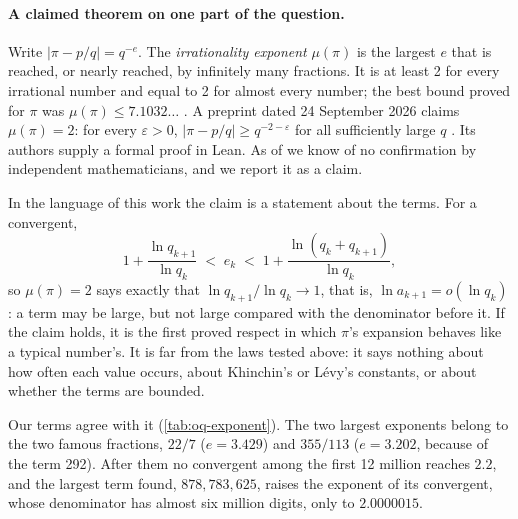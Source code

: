 \paragraph{A claimed theorem on one part of the question.} Write $|\pi - p/q| = q^{-e}$. The \emph{irrationality exponent} $\mu(\pi)$ is the largest $e$ that is reached, or nearly reached, by infinitely many fractions. It is at least 2 for every irrational number and equal to 2 for almost every number; the best bound proved for $\pi$ was $\mu(\pi) \le 7.1032\ldots$ \citep{ZeilbergerZudilin2020}. A preprint dated 24 September 2026 claims $\mu(\pi) = 2$: for every $\varepsilon > 0$, $|\pi - p/q| \ge q^{-2-\varepsilon}$ for all sufficiently large $q$ \citep{PiExponent2026}. Its authors supply a formal proof in Lean. As of \revI{} we know of no confirmation by independent mathematicians, and we report it as a claim.

In the language of this work the claim is a statement about the terms. For a convergent,
\[ 1 + \frac{\ln q_{k+1}}{\ln q_k} \;<\; e_k \;<\; 1 + \frac{\ln(q_k + q_{k+1})}{\ln q_k}, \]
so $\mu(\pi) = 2$ says exactly that $\ln q_{k+1}/\ln q_k \to 1$, that is, $\ln a_{k+1} = o(\ln q_k)$: a term may be large, but not large compared with the denominator before it. If the claim holds, it is the first proved respect in which $\pi$'s expansion behaves like a typical number's. It is far from the laws tested above: it says nothing about how often each value occurs, about Khinchin's or Lévy's constants, or about whether the terms are bounded.

Our terms agree with it (\cref{tab:oq-exponent}). The two largest exponents belong to the two famous fractions, $22/7$ ($e = 3.429$) and $355/113$ ($e = 3.202$, because of the term 292). After them no convergent among the first 12 million reaches $2.2$, and the largest term found, $878{,}783{,}625$, raises the exponent of its convergent, whose denominator has almost six million digits, only to $2.0000015$.

